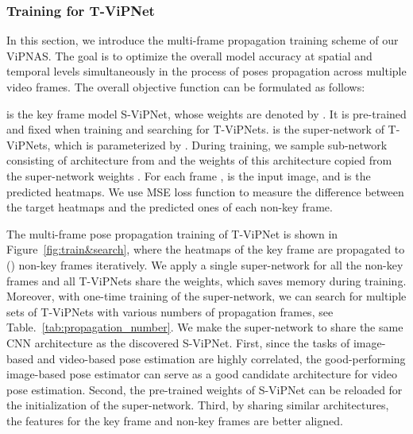 \documentclass[final]{cvpr}
\begin{document}
\subsubsection{Training for T-ViPNet}
\label{sec:train_tvip}
In this section, we introduce the multi-frame propagation training scheme of our ViPNAS. The goal is to optimize the overall model accuracy at spatial and temporal levels simultaneously in the process of poses propagation across multiple video frames. The overall objective function can be formulated as follows:





 is the key frame model S-ViPNet, whose weights are denoted by . It is pre-trained and fixed when training and searching for T-ViPNets.  is the super-network of T-ViPNets, which is parameterized by . During training, we sample sub-network consisting of architecture   from  and the weights of this architecture copied from the super-network weights . 
For each frame ,  is the input image, and  is the predicted heatmaps. We use MSE loss function  to measure the difference between the target heatmaps and the predicted ones of each non-key frame.

The multi-frame pose propagation training of T-ViPNet is shown in Figure~\ref{fig:train&search}, where the heatmaps of the key frame are propagated to  () non-key frames iteratively. We apply a single super-network  for all the non-key frames and all T-ViPNets share the weights, which saves memory during training. Moreover, with one-time training of the super-network, we can search for multiple sets of T-ViPNets with various numbers of propagation frames, see Table.~\ref{tab:propagation_number}. We make the super-network  to share the same CNN architecture as the discovered S-ViPNet. First, since the tasks of image-based and video-based pose estimation are highly correlated, the good-performing image-based pose estimator can serve as a good candidate architecture for video pose estimation. Second, the pre-trained weights of S-ViPNet can be reloaded for the initialization of the super-network. Third, by sharing similar architectures, the features for the key frame and non-key frames are better aligned.
\end{document}
